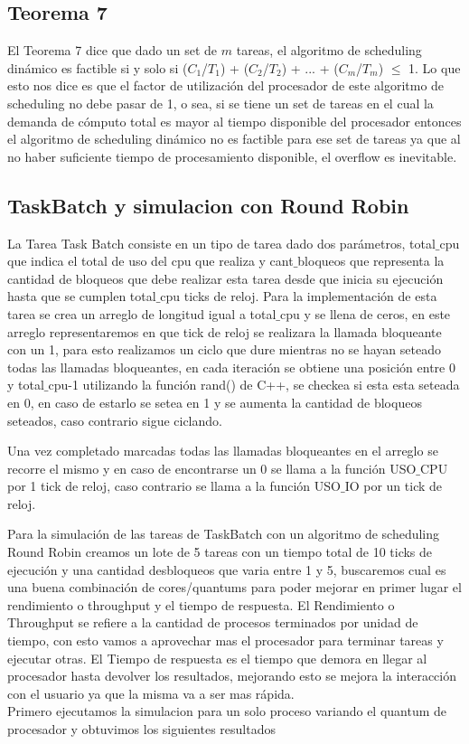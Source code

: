 \subsection{Teorema 7}
El Teorema 7 dice que dado un set de $m$ tareas, el algoritmo de scheduling dinámico es factible si y solo si ($C_1$/$T_1$) + ($C_2$/$T_2$) + ... + ($C_m$/$T_m$) $\le$ 1. Lo que esto nos dice es que el factor de utilización del procesador de este algoritmo de scheduling no debe pasar de 1, o sea, si se tiene un set de tareas en el cual la demanda de cómputo total es mayor al tiempo disponible del procesador entonces el algoritmo de scheduling dinámico no es factible para ese set de tareas ya que al no haber suficiente tiempo de procesamiento disponible, el overflow es inevitable.


\subsection{TaskBatch y simulacion con Round Robin}
La Tarea Task Batch consiste en un tipo de tarea dado dos parámetros, total$\_$cpu que indica el total de uso del cpu que realiza y cant$\_$bloqueos que representa la cantidad de bloqueos que debe realizar esta tarea desde que inicia su ejecución hasta que se cumplen total$\_$cpu ticks de reloj. Para la implementación de esta tarea se crea un arreglo de longitud igual a total$\_$cpu y se llena de ceros, en este arreglo representaremos en que tick de reloj se realizara la llamada bloqueante con un 1, para esto realizamos un ciclo que dure mientras no se hayan seteado todas las llamadas bloqueantes, en cada iteración se obtiene una posición entre 0 y total$\_$cpu-1 utilizando la función rand() de C++, se checkea si esta esta seteada en 0, en caso de estarlo se setea en 1 y se aumenta la cantidad de bloqueos seteados, caso contrario sigue ciclando.

Una vez completado marcadas todas las llamadas bloqueantes en el arreglo se recorre el mismo y en caso de encontrarse un 0 se llama a la función USO$\_$CPU por 1 tick de reloj, caso contrario se llama a la función USO$\_$IO por un tick de reloj.

Para la simulación de las tareas de TaskBatch con un algoritmo de scheduling Round Robin creamos un lote de 5 tareas con un tiempo total de 10 ticks de ejecución y una cantidad desbloqueos que varia entre 1 y 5, buscaremos cual es una buena combinación de cores/quantums para poder mejorar en primer lugar el rendimiento o throughput y el tiempo de respuesta.
El Rendimiento o Throughput se refiere a la cantidad de procesos terminados por unidad de tiempo, con esto vamos a aprovechar mas el procesador para terminar tareas y ejecutar otras.
El Tiempo de respuesta es el tiempo que demora en llegar al procesador hasta devolver los resultados, mejorando esto se mejora la interacción con el usuario ya que la misma va a ser mas rápida.\\
Primero ejecutamos la simulacion para un solo proceso variando el quantum de procesador y obtuvimos los siguientes resultados

